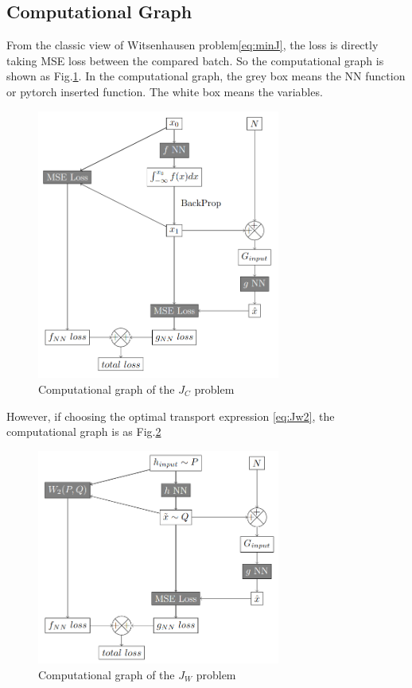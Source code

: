 \documentclass[conference,compsoc]{IEEEtran}
\begin{document}
\subsection{Computational Graph}
From the classic view of Witsenhausen problem\eqref{eq:minJ}, the loss is directly taking MSE loss between the compared batch. So the computational graph is shown as Fig.\ref{fig:classic comp graph}. In the computational graph, the grey box means the NN function or pytorch inserted function. The white box means the variables.
\begin{figure}[htp]
  \centering
  \includegraphics[width=8cm]{computational_graph/J_C.png}
  \caption{Computational graph of the $J_C$ problem}
  \label{fig:classic comp graph}
\end{figure}

However, if choosing the optimal transport expression \eqref{eq:Jw2}, the computational graph is as Fig.\ref{fig:Wasserstein comp graph}
\begin{figure}[htp]
  \centering
  \includegraphics[width=8cm]{computational_graph/J_W.png}
  \caption{Computational graph of the $J_W$ problem}
  \label{fig:Wasserstein comp graph}
\end{figure}
\end{document}
